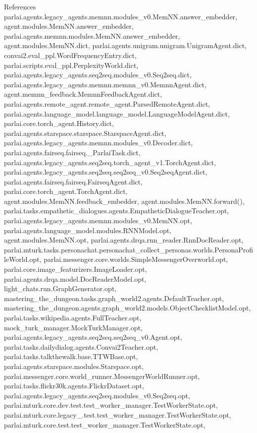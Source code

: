 References parlai.\+agents.\+legacy\+\_\+agents.\+memnn.\+modules\+\_\+v0.\+Mem\+N\+N.\+answer\+\_\+embedder, agent.\+modules.\+Mem\+N\+N.\+answer\+\_\+embedder, parlai.\+agents.\+memnn.\+modules.\+Mem\+N\+N.\+answer\+\_\+embedder, agent.\+modules.\+Mem\+N\+N.\+dict, parlai.\+agents.\+unigram.\+unigram.\+Unigram\+Agent.\+dict, convai2.\+eval\+\_\+ppl.\+Word\+Frequency\+Entry.\+dict, parlai.\+scripts.\+eval\+\_\+ppl.\+Perplexity\+World.\+dict, parlai.\+agents.\+legacy\+\_\+agents.\+seq2seq.\+modules\+\_\+v0.\+Seq2seq.\+dict, parlai.\+agents.\+legacy\+\_\+agents.\+memnn.\+memnn\+\_\+v0.\+Memnn\+Agent.\+dict, agent.\+memnn\+\_\+feedback.\+Memnn\+Feedback\+Agent.\+dict, parlai.\+agents.\+remote\+\_\+agent.\+remote\+\_\+agent.\+Parsed\+Remote\+Agent.\+dict, parlai.\+agents.\+language\+\_\+model.\+language\+\_\+model.\+Language\+Model\+Agent.\+dict, parlai.\+core.\+torch\+\_\+agent.\+History.\+dict, parlai.\+agents.\+starspace.\+starspace.\+Starspace\+Agent.\+dict, parlai.\+agents.\+legacy\+\_\+agents.\+memnn.\+modules\+\_\+v0.\+Decoder.\+dict, parlai.\+agents.\+fairseq.\+fairseq.\+\_\+\+Parlai\+Task.\+dict, parlai.\+agents.\+legacy\+\_\+agents.\+seq2seq.\+torch\+\_\+agent\+\_\+v1.\+Torch\+Agent.\+dict, parlai.\+agents.\+legacy\+\_\+agents.\+seq2seq.\+seq2seq\+\_\+v0.\+Seq2seq\+Agent.\+dict, parlai.\+agents.\+fairseq.\+fairseq.\+Fairseq\+Agent.\+dict, parlai.\+core.\+torch\+\_\+agent.\+Torch\+Agent.\+dict, agent.\+modules.\+Mem\+N\+N.\+feedback\+\_\+embedder, agent.\+modules.\+Mem\+N\+N.\+forward(), parlai.\+tasks.\+empathetic\+\_\+dialogues.\+agents.\+Empathetic\+Dialogue\+Teacher.\+opt, parlai.\+agents.\+legacy\+\_\+agents.\+memnn.\+modules\+\_\+v0.\+Mem\+N\+N.\+opt, parlai.\+agents.\+language\+\_\+model.\+modules.\+R\+N\+N\+Model.\+opt, agent.\+modules.\+Mem\+N\+N.\+opt, parlai.\+agents.\+drqa.\+rnn\+\_\+reader.\+Rnn\+Doc\+Reader.\+opt, parlai.\+mturk.\+tasks.\+personachat.\+personachat\+\_\+collect\+\_\+personas.\+worlds.\+Persona\+Profile\+World.\+opt, parlai.\+messenger.\+core.\+worlds.\+Simple\+Messenger\+Overworld.\+opt, parlai.\+core.\+image\+\_\+featurizers.\+Image\+Loader.\+opt, parlai.\+agents.\+drqa.\+model.\+Doc\+Reader\+Model.\+opt, light\+\_\+chats.\+run.\+Graph\+Generator.\+opt, mastering\+\_\+the\+\_\+dungeon.\+tasks.\+graph\+\_\+world2.\+agents.\+Default\+Teacher.\+opt, mastering\+\_\+the\+\_\+dungeon.\+agents.\+graph\+\_\+world2.\+models.\+Object\+Checklist\+Model.\+opt, parlai.\+tasks.\+wikipedia.\+agents.\+Full\+Teacher.\+opt, mock\+\_\+turk\+\_\+manager.\+Mock\+Turk\+Manager.\+opt, parlai.\+agents.\+legacy\+\_\+agents.\+seq2seq.\+seq2seq\+\_\+v0.\+Agent.\+opt, parlai.\+tasks.\+dailydialog.\+agents.\+Convai2\+Teacher.\+opt, parlai.\+tasks.\+talkthewalk.\+base.\+T\+T\+W\+Base.\+opt, parlai.\+agents.\+starspace.\+modules.\+Starspace.\+opt, parlai.\+messenger.\+core.\+world\+\_\+runner.\+Messenger\+World\+Runner.\+opt, parlai.\+tasks.\+flickr30k.\+agents.\+Flickr\+Dataset.\+opt, parlai.\+agents.\+legacy\+\_\+agents.\+seq2seq.\+modules\+\_\+v0.\+Seq2seq.\+opt, parlai.\+mturk.\+core.\+dev.\+test.\+test\+\_\+worker\+\_\+manager.\+Test\+Worker\+State.\+opt, parlai.\+mturk.\+core.\+legacy\+\_.\+test.\+test\+\_\+worker\+\_\+manager.\+Test\+Worker\+State.\+opt, parlai.\+mturk.\+core.\+test.\+test\+\_\+worker\+\_\+manager.\+Test\+Worker\+State.\+opt, 